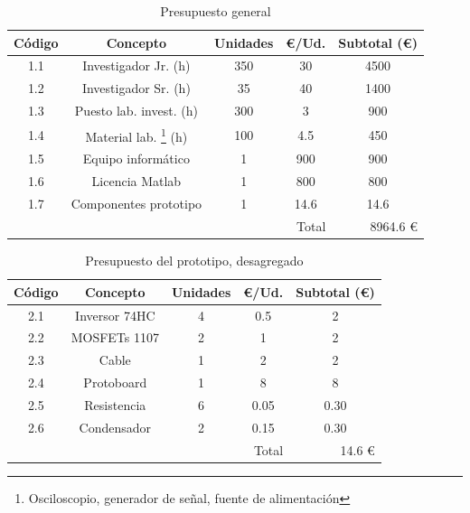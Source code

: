 \documentclass[12pt]{report} %
\begin{document}
	\begin{table}[H]
		\begin{tabular}{|c|c|c|c|c|}
			\hline
			Código & Concepto & Unidades & €/Ud. & Subtotal (€) \\
			\hline
			1.1 & Investigador Jr. (h) & 350 & 30 & 4500 \\
			1.2 & Investigador Sr. (h) & 35 & 40 & 1400 \\
			1.3 & Puesto lab. invest. (h) & 300 & 3 & 900 \\
			1.4 & Material lab. \footnote{Osciloscopio, generador de señal, fuente de alimentación}  (h) & 100 &
			 4.5 & 450 \\
			1.5 & Equipo informático & 1 & 900 & 900 \\
			1.6 & Licencia Matlab & 1 & 800 & 800 \\
			1.7 & Componentes prototipo & 1 & 14.6 & 14.6 \\
			\hline
			\multicolumn{4}{r}{Total} & \multicolumn{1}{r}{8964.6 €} \\
		\end{tabular}
		\caption{Presupuesto general}
	\end{table}

	\begin{table}[H]
		\begin{tabular}{|c|c|c|c|c|}
			\hline
			Código & Concepto & Unidades & €/Ud. & Subtotal (€) \\
			\hline
			2.1 & Inversor 74HC & 4 & 0.5 & 2 \\
			2.2 & MOSFETs 1107 & 2 & 1 & 2 \\
			2.3 & Cable & 1 & 2 & 2 \\
			2.4 & Protoboard & 1 & 8 & 8 \\
			2.5 & Resistencia & 6 & 0.05 & 0.30 \\
			2.6 & Condensador & 2 & 0.15 & 0.30 \\
			\hline
			\multicolumn{4}{r}{Total} & \multicolumn{1}{r}{14.6 €} \\
		\end{tabular}
		\caption{Presupuesto del prototipo, desagregado}
	\end{table}

\nocite{*} %

\clearpage


\printbibliography


\end{document}
